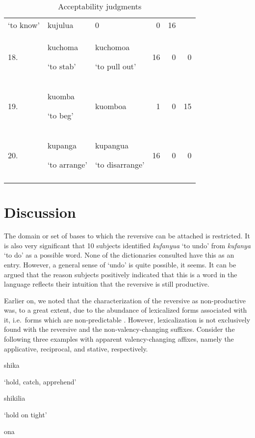 \documentclass[output=paper]{langsci/langscibook}
\begin{document}
\begin{table}
{\begin{tabularx}{\textwidth}{lXXrrr}
 ‘to know’ & kujulua &  0 &  0 &  16\\
 18. & kuchoma

 ‘to stab’ & kuchomoa

 ‘to pull out’ &  16 &  0 &  0\\
 19. & kuomba

 ‘to beg’ &  kuomboa &  1 &  0 &  15\\
 20. &  kupanga   

 ‘to arrange’ & kupangua

 ‘to disarrange’ &  16 &  0 &  0\\
\lspbottomrule
\end{tabularx}
}
\caption{Acceptability judgments}
\label{tab:ngonyaningowa:4}
\end{table}


\section{Discussion}\label{sec:ngonyaningowa:5}

The domain or set of bases to which the reversive can be attached \citep{HaspelmathSims2010} is restricted. It is also very significant that 10 subjects identified \textit{kufanyua} ‘to undo’ from \textit{kufanya} ‘to do’ as a possible word. None of the dictionaries consulted have this as an entry. However, a general sense of ‘undo’ is quite possible, it seems. It can be argued that the reason subjects positively indicated that this is a word in the language reflects their intuition that the reversive is still productive. 

Earlier on, we noted that the characterization of the reversive as non-productive was, to a great extent, due to the abundance of lexicalized forms associated with it, i.e.\ forms which are non-predictable \citep{Shepardson1986}. However, lexicalization is not exclusively found with the reversive and the non-valency-changing suffixes. Consider the following three examples with apparent valency-changing affixes, namely the applicative, reciprocal, and stative, respectively. 

\ea\label{ex:ngonyaningowa:11}
\ea\label{ex:ngonyaningowa:11a}
{shika}

  ‘hold, catch, apprehend’

\ex\label{ex:ngonyaningowa:11b} 
shikilia

  ‘hold on tight’
\z
\z 

\ea\label{ex:ngonyaningowa:12}
\ea\label{ex:ngonyaningowa:12a}
ona
\end{document}
